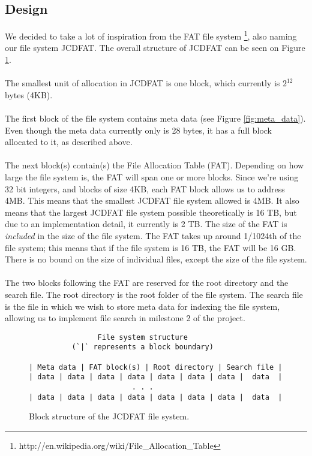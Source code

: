\documentclass[a4paper,12pt]{article}
\begin{document}
\subsection{Design}
We decided to take a lot of inspiration from the FAT file system
\footnote{http://en.wikipedia.org/wiki/File\_Allocation\_Table}, also naming our file system JCDFAT. The overall structure of JCDFAT can be seen on Figure \ref{fig:block_structure}.\\
\\
The smallest unit of allocation in JCDFAT is one block, which currently is $2^{12}$ bytes (4KB).\\
\\
The first block of the file system contains meta data (see Figure \ref{fig:meta_data}). Even though the meta data currently only is 28 bytes, it has a full block allocated to it, as described above.\\
\\
The next block(s) contain(s) the File Allocation Table (FAT). Depending on how large the file system is, the FAT will span one or more blocks.
Since we're using 32 bit integers, and blocks of size 4KB, each FAT block allows us to address 4MB. This means that the smallest JCDFAT file system allowed is 4MB. It also means that the largest JCDFAT file system possible theoretically is 16 TB, but due to an implementation detail, it currently is 2 TB. The size of the FAT is \emph{included} in the size of the file system. The FAT takes up around 1/1024th of the file system; this means that if the file system is 16 TB, the FAT will be 16 GB.\\
There is no bound on the size of individual files, except the size of the file system.\\
\\
The two blocks following the FAT are reserved for the root directory and the search file. The root directory is the root folder of the file system. The search file is the file in which we wish to store meta data for indexing the file system, allowing us to implement file search in milestone 2 of the project.
\begin{figure}[ht]
    \begin{verbatim}
                File system structure
          (`|` represents a block boundary)

| Meta data | FAT block(s) | Root directory | Search file |
| data | data | data | data | data | data | data |  data  |
                        . . .
| data | data | data | data | data | data | data |  data  |
    \end{verbatim}
    \caption{Block structure of the JCDFAT file system.}
    \label{fig:block_structure}
\end{figure}
\end{document}
